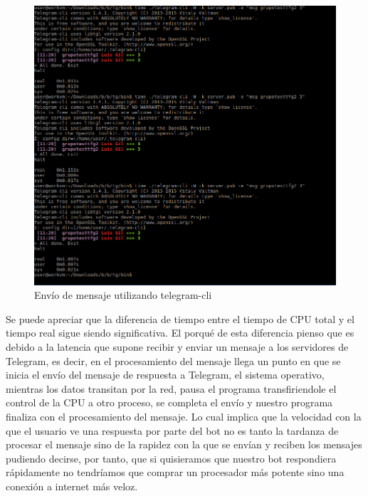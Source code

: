 \begin{figure}[H] %
\centering
\includegraphics[scale=0.4]{imagenes/random/Screenshot_2017-09-01_11-21-38}  %
\caption{Envío de mensaje utilizando telegram-cli}\label{figura94}
\end{figure}

Se puede apreciar que la diferencia de tiempo entre el tiempo de CPU total y el tiempo real sigue siendo significativa. El porqué de esta diferencia pienso que es debido a la latencia que supone recibir y enviar un mensaje a los servidores de Telegram, es decir, en el procesamiento del mensaje llega un punto en que se inicia el envío del mensaje de respuesta a Telegram, el sistema operativo, mientras los datos transitan por la red, pausa el programa transfiriendole el control de la CPU a otro proceso, se completa el envío y nuestro programa finaliza con el procesamiento del mensaje.
Lo cual implica que la velocidad con la que el usuario ve una respuesta por parte del bot no es tanto la tardanza de procesar el mensaje sino de la rapidez con la que se envían y reciben los mensajes pudiendo decirse, por tanto, que si quisieramos que nuestro bot respondiera rápidamente no tendríamos que comprar un procesador más potente sino una conexión a internet más veloz.
